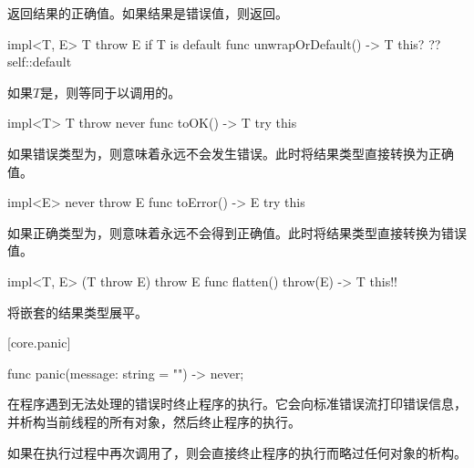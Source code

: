 \pnum
{}返回结果的正确值。如果结果是错误值，则返回。

\begin{itemdecl}
impl<T, E> T throw E if T is default {
    func unwrapOrDefault() -> T {
        this? ?? self::default
    }
}
\end{itemdecl}

\pnum
如果$T$是，则等同于以调用的。

\begin{itemdecl}
impl<T> T throw never {
    func toOK() -> T {
        try this
    }
}
\end{itemdecl}

\pnum
如果错误类型为，则意味着永远不会发生错误。此时将结果类型直接转换为正确值。

\begin{itemdecl}
impl<E> never throw E {
    func toError() -> E {
        try this
    }
}
\end{itemdecl}

\pnum
如果正确类型为，则意味着永远不会得到正确值。此时将结果类型直接转换为错误值。

\begin{itemdecl}
impl<T, E> (T throw E) throw E {
    func flatten() throw(E) -> T {
        this!!
    }
}
\end{itemdecl}

\pnum
{}将嵌套的结果类型展平。

[core.panic]{}

\begin{itemdecl}
func panic(message: string = "") -> never;
\end{itemdecl}

\pnum
{}在程序遇到无法处理的错误时终止程序的执行。它会向标准错误流打印错误信息，并析构当前线程的所有对象，然后终止程序的执行。

\pnum
如果在执行过程中再次调用了，则会直接终止程序的执行而略过任何对象的析构。